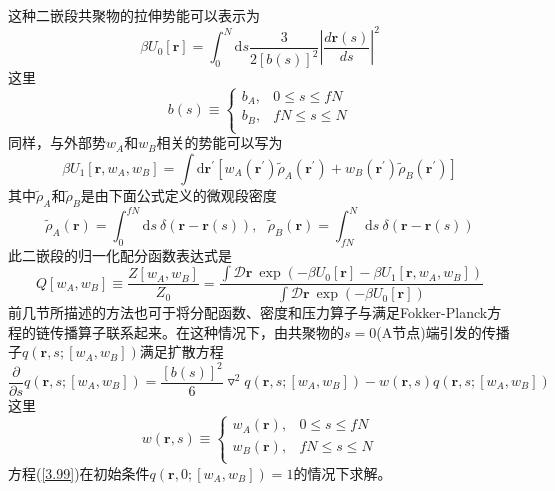 这种二嵌段共聚物的拉伸势能可以表示为
\begin{equation}
\beta U_0[\mathbf{r}]=\int_{0}^{N} \mathrm{d}s\frac{3}{2[b(s)]^2}\left| \frac{d\mathbf{r}(s)}{ds} \right|^2
\end{equation}
这里
\begin{equation}
b(s)\equiv
\begin{cases}
b_A, & 0\leq s \leq fN \\
b_B, & fN \leq s \leq N\\
\end{cases}
\end{equation}
同样，与外部势$w_A$和$w_B$相关的势能可以写为
\begin{equation}
\beta U_1[\mathbf{r},w_A,w_B]=\int \mathrm{d}\mathbf{r}^{'}[w_A(\mathbf{r}^{'})\tilde{\rho}_{A}(\mathbf{r}^{'})+w_B(\mathbf{r}^{'})\tilde{\rho}_{B}(\mathbf{r}^{'})]
\end{equation}
其中$\tilde{\rho} _A$和$\tilde{\rho} _B$是由下面公式定义的微观段密度
\begin{equation}
\tilde{\rho} _A(\mathbf{r})=\int _0^{fN} \mathrm{d}s~\delta(\mathbf{r}-\mathbf{r}(s)),~~~\tilde{\rho} _B(\mathbf{r})=\int _{fN}^{N} \mathrm{d}s~\delta(\mathbf{r}-\mathbf{r}(s))
\end{equation}
此二嵌段的归一化配分函数表达式是
\begin{equation}
Q[w_A,w_B]\equiv\frac{Z[w_A,w_B]}{Z_0}=\frac{\int \mathcal{D}\mathbf{r}~\exp(-\beta U_0[\mathbf{r}]-\beta U_1[\mathbf{r},w_A,w_B])}{\int \mathcal{D}\mathbf{r}~\exp(-\beta U_0[\mathbf{r}])}
\end{equation}
前几节所描述的方法也可于将分配函数、密度和压力算子与满足Fokker-Planck方程的链传播算子联系起来。在这种情况下，由共聚物的$s=0$(A节点)端引发的传播子$q(\mathbf{r},s;[w_A,w_B])$满足扩散方程
\begin{equation}
\frac{\partial}{\partial s}q(\mathbf{r},s;[w_A,w_B])=\frac{[b(s)]^2}{6}\triangledown ^2q(\mathbf{r},s;[w_A,w_B])-w(\mathbf{r},s)q(\mathbf{r},s;[w_A,w_B]) \label{3.99}
\end{equation}
这里
\begin{equation}
w(\mathbf{r},s)\equiv
\begin{cases}
w_A(\mathbf{r}), & 0\leq s \leq fN \\
w_B(\mathbf{r}), & fN \leq s \leq N\\
\end{cases}
\end{equation}
方程(\ref{3.99})在初始条件$q(\mathbf{r},0;[w_A,w_B])=1$的情况下求解。

